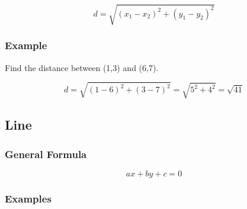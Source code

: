 \documentclass{article}
\begin{document}
$$d=\sqrt{(x_1-x_2)^2+(y_1-y_2)^2}$$

\subsubsection{Example}

Find the distance between (1,3) and (6,7).

$$d=\sqrt{(1-6)^2+(3-7)^2}=\sqrt{5^2+4^2}=\sqrt{41}$$

\subsection{Line}
\subsubsection{General Formula}
$$ax+by+c=0$$
\subsubsection{Examples}



\end{document}
